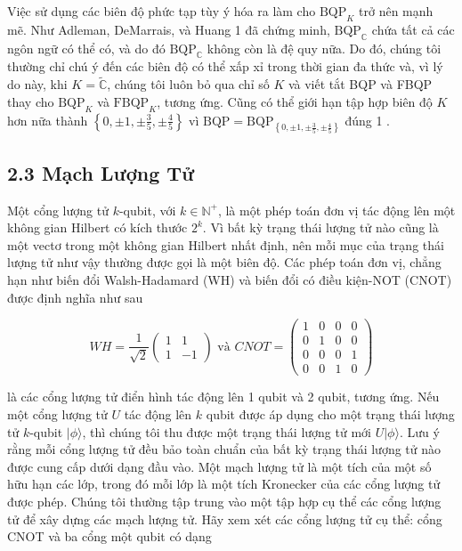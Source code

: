 \documentclass[10pt]{article}
\begin{document}
Việc sử dụng các biên độ phức tạp tùy ý hóa ra làm cho $\mathrm{BQP}_{K}$ trở nên mạnh mẽ. Như Adleman, DeMarrais, và Huang 1 đã chứng minh, $\mathrm{BQP}_{\mathbb{C}}$ chứa tất cả các ngôn ngữ có thể có, và do đó $\mathrm{BQP}_{\mathbb{C}}$ không còn là đệ quy nữa. Do đó, chúng tôi thường chỉ chú ý đến các biên độ có thể xấp xỉ trong thời gian đa thức và, vì lý do này, khi $K=\tilde{\mathbb{C}}$, chúng tôi luôn bỏ qua chỉ số $K$ và viết tắt BQP và FBQP thay cho $\mathrm{BQP}_{K}$ và $\mathrm{FBQP}_{K}$, tương ứng. Cũng có thể giới hạn tập hợp biên độ $K$ hơn nữa thành $\left\{0, \pm 1, \pm \frac{3}{5}, \pm \frac{4}{5}\right\}$ vì $\mathrm{BQP}=\mathrm{BQP}_{\left\{0, \pm 1, \pm \frac{3}{5}, \pm \frac{4}{5}\right\}}$ đúng 1 .

\subsection*{2.3 Mạch Lượng Tử}
Một cổng lượng tử $k$-qubit, với $k \in \mathbb{N}^{+}$, là một phép toán đơn vị tác động lên một không gian Hilbert có kích thước $2^{k}$. Vì bất kỳ trạng thái lượng tử nào cũng là một vectơ trong một không gian Hilbert nhất định, nên mỗi mục của trạng thái lượng tử như vậy thường được gọi là một biên độ. Các phép toán đơn vị, chẳng hạn như biến đổi Walsh-Hadamard (WH) và biến đổi có điều kiện-NOT (CNOT) được định nghĩa như sau

$$
W H=\frac{1}{\sqrt{2}}\left(\begin{array}{cc}
1 & 1 \\
1 & -1
\end{array}\right) \text { và } C N O T=\left(\begin{array}{cccc}
1 & 0 & 0 & 0 \\
0 & 1 & 0 & 0 \\
0 & 0 & 0 & 1 \\
0 & 0 & 1 & 0
\end{array}\right)
$$

là các cổng lượng tử điển hình tác động lên 1 qubit và 2 qubit, tương ứng. Nếu một cổng lượng tử $U$ tác động lên $k$ qubit được áp dụng cho một trạng thái lượng tử $k$-qubit $|\phi\rangle$, thì chúng tôi thu được một trạng thái lượng tử mới $U|\phi\rangle$. Lưu ý rằng mỗi cổng lượng tử đều bảo toàn chuẩn của bất kỳ trạng thái lượng tử nào được cung cấp dưới dạng đầu vào. Một mạch lượng tử là một tích của một số hữu hạn các lớp, trong đó mỗi lớp là một tích Kronecker của các cổng lượng tử được phép. Chúng tôi thường tập trung vào một tập hợp cụ thể các cổng lượng tử để xây dựng các mạch lượng tử. Hãy xem xét các cổng lượng tử cụ thể: cổng CNOT và ba cổng một qubit có dạng
\end{document}
